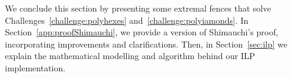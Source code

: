 \documentclass{amsart}
\newtheorem{theorem}{Theorem}
\theoremstyle{definition}
\theoremstyle{remark}
\begin{document}
	
	
	
	
	
	
	
	
	
	
	We conclude this section by presenting some extremal fences that solve Challenges~\ref{challenge:polyhexes} and~\ref{challenge:polyiamonds}. In Section~\ref{app:proofShimauchi}, we provide a version of Shimauchi's proof, incorporating improvements and clarifications. Then, in Section~\ref{sec:ilp} we explain the mathematical modelling and algorithm behind our ILP implementation.
	
\end{document}
